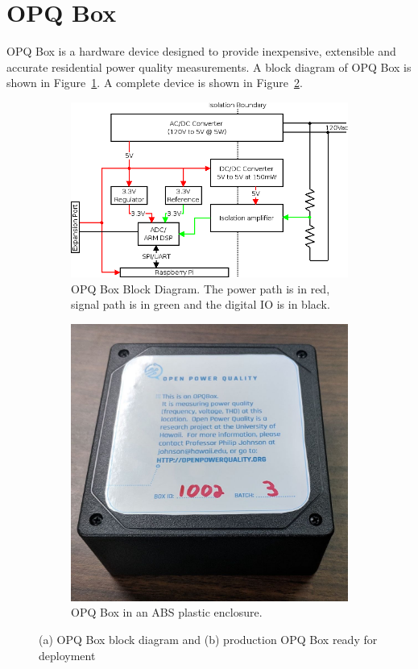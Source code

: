 \section{OPQ Box}
\label{sec:opq-box}

OPQ Box is a hardware device designed to provide inexpensive, extensible and accurate residential power quality measurements.
A block diagram of OPQ Box is shown in Figure~\ref{fig:opq:1:1}.
A complete device is shown in Figure~\ref{fig:opq:1:2}.

\begin{figure}[h]
	\centering
	\begin{subfigure}{.5\textwidth}
	  \centering
	  \includegraphics[width=0.9\linewidth]{images/opq-box/opqbox_diagram.png}
	  \caption{OPQ Box Block Diagram.
	  The power path is in red, signal path is in green and the digital IO is in black.}
	  \label{fig:opq:1:1}
	\end{subfigure}%
	\begin{subfigure}{.5\textwidth}
	  \centering
	  \includegraphics[width=0.7\linewidth]{images/opq-box/opqbox_photo.jpg}
	  \caption{OPQ Box in an ABS plastic enclosure.}
	  \label{fig:opq:1:2}
	\end{subfigure}
	\caption{(a) OPQ Box block diagram and (b) production OPQ Box ready for deployment}
	\label{fig:opq:2}
\end{figure}

